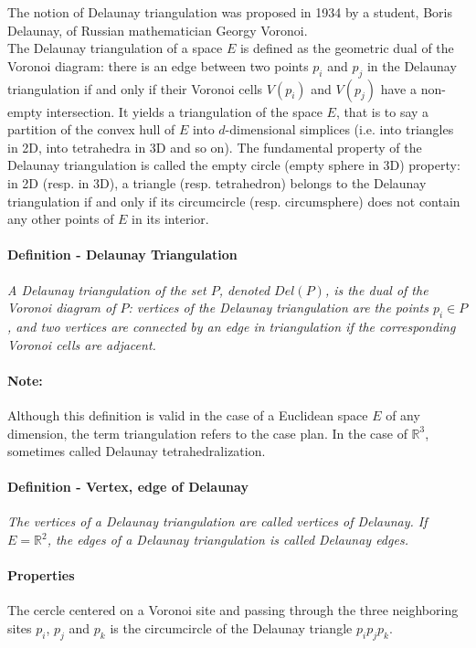 The notion of Delaunay triangulation was proposed in 1934 by a student, Boris Delaunay, of Russian mathematician Georgy Voronoi. \\
The Delaunay triangulation of a space $E$ is defined as the geometric dual of the Voronoi diagram: there is an edge between two points $p_{i}$ and $p_{j}$ in the Delaunay triangulation if and only if their Voronoi cells $V(p_{i})$ and $V(p_{j})$ have a non-empty intersection. It yields a triangulation of the space $E$, that is to say a partition of the convex hull of $E$ into $d$-dimensional simplices (i.e. into triangles in 2D, into tetrahedra in 3D and so on). The fundamental property of the Delaunay triangulation is called the empty circle (empty sphere in 3D) property: in 2D (resp. in 3D), a triangle (resp. tetrahedron) belongs to the Delaunay triangulation if and only if its circumcircle (resp. circumsphere) does not contain any other points of $E$ in its interior. \\

\paragraph{Definition - Delaunay Triangulation}
{
\it A Delaunay triangulation of the set $P$, denoted $Del(P)$, is the dual of the Voronoi diagram of $P$: vertices of the Delaunay triangulation are the points $p_{i} \in P$, and two vertices are connected by an edge in triangulation if the corresponding Voronoi cells are adjacent.
}

\paragraph{Note:}
{
Although this definition is valid in the case of a Euclidean space $E$ of any dimension, the term triangulation refers to the case plan. In the case of $\mathbb{R}^{3}$, sometimes called Delaunay tetrahedralization.
}

\paragraph{Definition - Vertex, edge of Delaunay}
{
\it The vertices of a Delaunay triangulation are called vertices of Delaunay. If $E = \mathbb{R}^{2}$, the edges of a Delaunay triangulation is called Delaunay edges.
}

\paragraph{Properties}
{
The cercle centered on a Voronoi site and passing through the three neighboring sites $p_{i}$, $p_{j}$ and $p_{k}$ is the circumcircle of the Delaunay triangle $p_{i}p_{j}p_{k}$.
}



